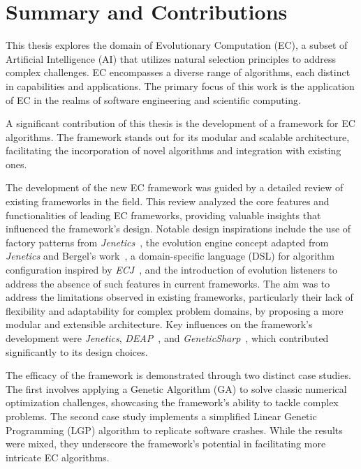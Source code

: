 \section{Summary and Contributions}
\label{sec:conclusions:summary}
    This thesis explores the domain of Evolutionary Computation (EC), a subset of Artificial Intelligence (AI) that 
    utilizes natural selection principles to address complex challenges. EC encompasses a diverse range of algorithms, 
    each distinct in capabilities and applications. The primary focus of this work is the application of EC in the 
    realms of software engineering and scientific computing.

    A significant contribution of this thesis is the development of a framework for EC algorithms. The framework stands 
    out for its modular and scalable architecture, facilitating the incorporation of novel algorithms and integration
    with existing ones.

    The development of the new EC framework was guided by a detailed review of existing frameworks in the field. This 
    review analyzed the core features and functionalities of leading EC frameworks, providing valuable insights that 
    influenced the framework's design. Notable design inspirations include the use of factory patterns from
    \textit{Jenetics}~\autocite{wilhelmstotterJeneticsJavaGenetica}, the evolution engine concept adapted from 
    \textit{Jenetics} and Bergel's work~\autocite{bergelAgileArtificialIntelligence2020}, a domain-specific language 
    (DSL) for algorithm configuration inspired by \textit{ECJ}~\autocite{ECJ}, and the introduction of evolution 
    listeners to address the absence of such features in current frameworks. The aim was to address the limitations 
    observed in existing frameworks, particularly their lack of flexibility and adaptability for complex problem 
    domains, by proposing a more modular and extensible architecture. Key influences on the framework's development 
    were \textit{Jenetics}, \textit{DEAP}~\autocite{DEAPDocumentationDEAP}, and 
    \textit{GeneticSharp}~\autocite{giacomelliGeneticSharp2023}, which contributed significantly to its design choices.

    The efficacy of the framework is demonstrated through two distinct case studies. The first involves applying a 
    Genetic Algorithm (GA) to solve classic numerical optimization challenges, showcasing the framework's ability to 
    tackle complex problems. The second case study implements a simplified Linear Genetic Programming (LGP) algorithm to 
    replicate software crashes. While the results were mixed, they underscore the framework's potential in facilitating 
    more intricate EC algorithms.

